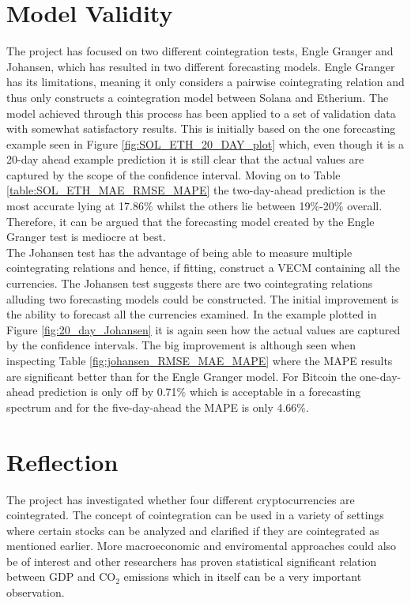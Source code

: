 \section{Model Validity}
The project has focused on two different cointegration tests, Engle Granger and Johansen, which has resulted in two different forecasting models. Engle Granger has its limitations, meaning it only considers a pairwise cointegrating relation and thus only constructs a cointegration model between Solana and Etherium. The model achieved through this process has been applied to a set of validation data with somewhat satisfactory results. This is initially based on the one forecasting example seen in Figure \ref{fig:SOL_ETH_20_DAY_plot} which, even though it is a 20-day ahead example prediction it is still clear that the actual values are captured by the scope of the confidence interval. Moving on to Table \ref{table:SOL_ETH_MAE_RMSE_MAPE} the two-day-ahead prediction is the most accurate lying at 17.86\% whilst the others lie between 19\%-20\% overall. Therefore, it can be argued that the forecasting model created by the Engle Granger test is mediocre at best.\\
The Johansen test has the advantage of being able to measure multiple cointegrating relations and hence, if fitting, construct a VECM containing all the currencies. The Johansen test suggests there are two cointegrating relations alluding two forecasting models could be constructed. The initial improvement is the ability to forecast all the currencies examined. In the example plotted in Figure \ref{fig:20_day_Johansen} it is again seen how the actual values are captured by the confidence intervals. The big improvement is although seen when inspecting Table \ref{fig:johansen_RMSE_MAE_MAPE} where the MAPE results are significant better than for the Engle Granger model. For Bitcoin the one-day-ahead prediction is only off by 0.71$\%$ which is acceptable in a forecasting spectrum and for the five-day-ahead the MAPE is only 4.66$\%$.

\section{Reflection}
The project has investigated whether four different cryptocurrencies are cointegrated. The concept of cointegration can be used in a variety of settings where certain stocks can be analyzed and clarified if they are cointegrated as mentioned earlier. More macroeconomic and enviromental approaches could also be of interest and other researchers has proven statistical significant relation between GDP and CO$_2$ emissions \cite{A_Cointegration_Analysis_of_Real_GDP} which in itself can be a very important observation.